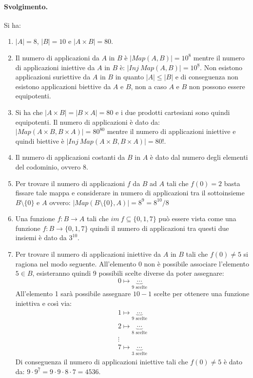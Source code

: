 \paragraph*{Svolgimento.} Si ha:
\begin{enumerate}
	\item $|A|=8$, $|B|=10$ e $|A \times B|=80$.
	\item Il numero di applicazioni da $A$ in $B$ è $|Map(A,B)| = 10^{8}$ mentre il numero di applicazioni iniettive da $A$ in $B$ è: $|Inj \ Map(A,B)| = 10^{\underline{8}}$. Non esistono applicazioni suriettive da $A$ in $B$ in quanto $|A| \leq |B|$ e di conseguenza non esistono applicazioni biettive da $A$ e $B$, non a caso $A$ e $B$ non possono essere equipotenti.
	\item Si ha che $|A \times B|=|B \times A|= 80$ e i due prodotti cartesiani sono quindi equipotenti. Il numero di applicazioni è dato da: $|Map(A \times B , B \times A)|=80^{80}$ mentre il numero di applicazioni iniettive e quindi biettive è $|Inj \ Map (A\times B, B \times A)|=80!$.
	\item Il numero di applicazioni costanti da $B$ in $A$ è dato dal numero degli elementi del codominio, ovvero $8$.
	\item Per trovare il numero di applicazioni $f$ da $B$ ad $A$ tali che $f(0)=2$ basta fissare tale mappa e considerare in numero di applicazioni tra il sottoinsieme $B \setminus\{0\}$ e $A$ ovvero: $|Map(B \setminus \{0\}, A)|= 8^{9}=8^{10}/8$
	\item Una funzione $f:B \rightarrow A$ tali che $im \ f \subseteq \{0,1,7\}$ può essere vista come una funzione $f: B \rightarrow \{0,1,7\}$ quindi il numero di applicazioni tra questi due insiemi è dato da $3^{10}$.
	\item Per trovare il numero di applicazioni iniettive da $A$ in $B$ tali che $f(0) \neq 5$ si ragiona nel modo seguente. All'elemento $0$ non è possibile associare l'elemento $5 \in B$, esisteranno quindi 9 possibili scelte diverse da poter assegnare:
	\begin{displaymath}
		0 \mapsto \underbrace{\cdots}_{\mbox{9 scelte}}
	\end{displaymath}
	All'elemento 1 sarà possibile assegnare $10-1$ scelte per ottenere una funzione iniettiva e così via:
	\begin{displaymath}
		\begin{array}{c}
			1 \mapsto \underbrace{\cdots}_{\mbox{9 scelte}} \\
			2 \mapsto \underbrace{\cdots}_{\mbox{8 scelte}} \\
			\vdots \\
			7 \mapsto \underbrace{\cdots}_{\mbox{3 scelte}}
		\end{array}
	\end{displaymath}
	Di conseguenza il numero di applicazioni iniettive tali che $f(0) \neq 5$ è dato da: $9 \cdot 9^{\underline{7}} = 9 \cdot 9 \cdot 8 \cdot 7 = 4536$.
\end{enumerate}
